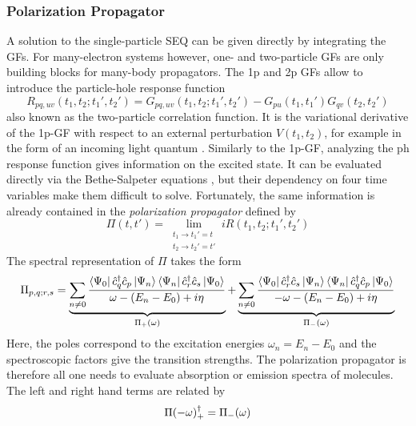 \subsubsection{Polarization Propagator}

A solution to the single-particle SEQ can be given directly by integrating the GFs. For many-electron systems however, one- and two-particle GFs are only building blocks for many-body propagators. The 1p and 2p GFs allow to introduce the particle-hole response function 
\begin{equation}
R_{pq,uv}(t_1,t_2;t_1',t_2') = G_{pq,uv}(t_1,t_2;t_1',t_2') - G_{pu}(t_1,t_1')G_{qv}(t_2,t_2')
\end{equation}
\noindent also known as the two-particle correlation function. It is the variational derivative of the 1p-GF with respect to an external perturbation $V(t_1,t_2)$, for example in the form of an incoming light quantum \cite{Bay1962}. Similarly to the 1p-GF, analyzing the ph response function gives information on the excited state. It can be evaluated directly via the Bethe-Salpeter equations \cite{Nam1950,Sal1951}, but their dependency on four time variables make them difficult to solve. Fortunately, the same information is already contained in the \emph{polarization propagator} defined by
\begin{equation}
\Pi(t,t') = \lim_{\substack{t_1 \rightarrow t_1'=t \\
t_2 \rightarrow t_2' = t'}} iR(t_1,t_2;t_1',t_2')
\end{equation}  
\noindent The spectral representation of $\Pi$ takes the form
\begin{equation}
\Pi _{p,q;r,s} = \underbrace{ \sum_{n \neq 0} \frac{ 
	\bra{\Psi_0} \hat{c}_q ^{\dagger} \hat{c}_p 		\ket{\Psi_n} \bra{\Psi_n} \hat{c}_r ^{\dagger} \hat{c}_s \ket{\Psi_0}
}{
	\omega - (E_n - E_0) + i \eta
} }_\text{$\Pi _+(\omega)$} + \underbrace{ \sum_{n \neq 0} \frac{ 
	\bra{\Psi_0} \hat{c}_r ^{\dagger} \hat{c}_s \ket{\Psi_n} \bra{\Psi_n} \hat{c}_q ^{\dagger} \hat{c}_p \ket{\Psi_0}
}{
	- \omega - (E_n - E_0) + i \eta
} }_\text{$\Pi _-(\omega)$}
\label{eq:POLPROP}
\end{equation}
\noindent Here, the poles correspond to the excitation energies $\omega_n = E_n - E_0$ and the spectroscopic factors give the transition strengths. The polarization propagator is therefore all one needs to evaluate absorption or emission spectra of molecules. The left and right hand terms are related by
\begin{equation}
\Pi(-\omega)_{+}^{\dagger} = \Pi_{-}(\omega)
\end{equation}

